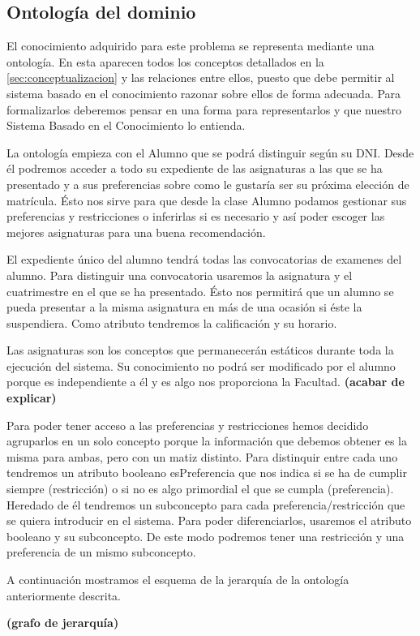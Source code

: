 
\subsection{Ontología del dominio} \label{sec:ontologia}

El conocimiento adquirido para este problema se representa mediante una 
ontología. En esta aparecen todos los conceptos detallados en la 
\autoref{sec:conceptualizacion} y las relaciones entre ellos, puesto que debe 
permitir al sistema basado en el conocimiento razonar sobre ellos de forma 
adecuada. Para formalizarlos deberemos pensar en una forma para representarlos y que nuestro Sistema Basado en el Conocimiento lo entienda.

La ontología empieza con el Alumno que se podrá distinguir según su DNI. Desde él podremos acceder a todo su expediente de las asignaturas a las que se ha presentado y a sus preferencias sobre como le gustaría ser su próxima elección de matrícula. Ésto nos sirve para que desde la clase Alumno podamos gestionar sus preferencias y restricciones o inferirlas si es necesario y así poder escoger las mejores asignaturas para una buena recomendación.

El expediente único del alumno tendrá todas las convocatorias de examenes del alumno. Para distinguir una convocatoria usaremos la asignatura y el cuatrimestre en el que se ha presentado. Ésto nos permitirá que un alumno se pueda presentar a la misma asignatura en más de una ocasión si éste la suspendiera. Como atributo tendremos la calificación y su horario.

Las asignaturas son los conceptos que permanecerán estáticos durante toda la ejecución del sistema. Su conocimiento no podrá ser modificado por el alumno porque es independiente a él y es algo nos proporciona la Facultad. \textbf{(acabar de explicar)}

Para poder tener acceso a las preferencias y restricciones hemos decidido agruparlos en un solo concepto porque la información que debemos obtener es la misma para ambas, pero con un matiz distinto. Para distinquir entre cada uno tendremos un atributo booleano esPreferencia que  nos indica si se ha de cumplir siempre (restricción) o si no es algo primordial el que se cumpla (preferencia). Heredado de él tendremos un subconcepto para cada preferencia/restricción que se quiera introducir en el sistema. Para poder diferenciarlos, usaremos el atributo booleano y su subconcepto. De este modo podremos tener una restricción y una preferencia de un mismo subconcepto.

A continuación mostramos el esquema de la jerarquía de la ontología anteriormente descrita.

\textbf{(grafo de jerarquía)}